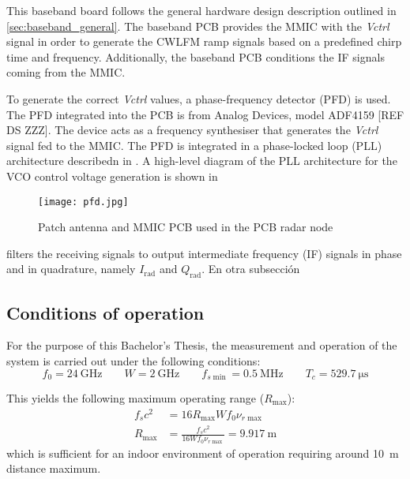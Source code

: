 This baseband board follows the general hardware design description outlined in \cref{sec:baseband_general}. The baseband PCB provides the MMIC with the \textit{Vctrl} signal in order to generate the CWLFM ramp signals based on a predefined chirp time and frequency. Additionally, the baseband PCB conditions the IF signals coming from the MMIC.

To generate the correct \textit{Vctrl} values, a phase-frequency detector (PFD) is used. The PFD integrated into the PCB is from Analog Devices, model ADF4159 [REF DS ZZZ]. The device acts as a frequency synthesiser that generates the \textit{Vctrl} signal fed to the MMIC. The PFD is integrated in a phase-locked loop (PLL) architecture describedn in \cite{Sardinero2022}. A high-level diagram of the PLL architecture for the VCO control voltage generation is shown in

\begin{figure}[ht]
	\centering
	\texttt{[image: pfd.jpg]}
	\caption{Patch antenna and MMIC PCB used in the PCB radar node \label{fig:rf_board}}
\end{figure}

 filters the receiving signals to output intermediate frequency (IF) signals in phase and in quadrature, namely $I_{\mathrm{rad}}$ and $Q_{\mathrm{rad}}$.
En otra subsección

\subsection{Conditions of operation}
For the purpose of this Bachelor's Thesis, the measurement and operation of the system is carried out under the following conditions:
\begin{equation} \label{eq:if_conditions}
	f_0 = \SI{24}{\giga\hertz} \qquad W = \SI{2}{\giga\hertz} \qquad f_{s\min} = \SI{0.5}{\mega\hertz} \qquad T_c = \SI{529.7}{\micro\second}
\end{equation}

This yields the following maximum operating range ($R_{\max}$):
\begin{align}
	f_s c^2 &= 16 R_{\max}W f_0 \nu_{r\max} \\
	R_{\max} &= \frac{f_s c^2}{16 W f_0 \nu_{r\max}} = \SI{9.917}{\meter}
\end{align}
which is sufficient for an indoor environment of operation requiring around \SI{10}{\meter} distance maximum.

